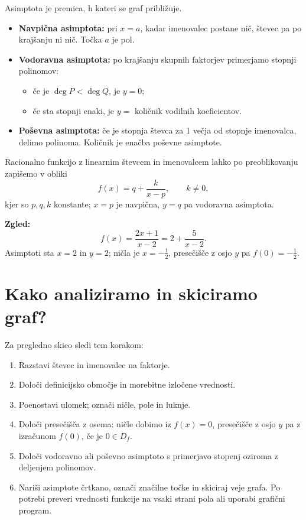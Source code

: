 \documentclass[11pt]{article}
\begin{document}
Asimptota je premica, h kateri se graf približuje.

\begin{itemize}[leftmargin=*]
  \item \textbf{Navpična asimptota:} pri $x=a$, kadar imenovalec postane nič, števec pa po krajšanju ni nič. Točka $a$ je pol.
  \item \textbf{Vodoravna asimptota:} po krajšanju skupnih faktorjev primerjamo stopnji polinomov:
    \begin{itemize}
      \item če je $\deg P<\deg Q$, je $y=0$;
      \item če sta stopnji enaki, je $y=$ količnik vodilnih koeficientov.
    \end{itemize}
  \item \textbf{Poševna asimptota:} če je stopnja števca za 1 večja od stopnje imenovalca, delimo polinoma. Količnik je enačba poševne asimptote.
\end{itemize}

Racionalno funkcijo z linearnim števcem in imenovalcem lahko po preoblikovanju zapišemo v obliki
\[
 f(x)=q+\frac{k}{x-p},\qquad k\ne 0,
\]
kjer so $p,q,k$ konstante; $x=p$ je navpična, $y=q$ pa vodoravna asimptota.

\textbf{Zgled:}
\[
 f(x)=\frac{2x+1}{x-2}=2+\frac{5}{x-2}.
\]
Asimptoti sta $x=2$ in $y=2$; ničla je $x=-\frac{1}{2}$, presečišče z osjo $y$ pa $f(0)=-\frac{1}{2}$.

\section{Kako analiziramo in skiciramo graf?}

Za pregledno skico sledi tem korakom:

\begin{enumerate}[leftmargin=*]
  \item Razstavi števec in imenovalec na faktorje.
  \item Določi definicijsko območje in morebitne izločene vrednosti.
  \item Poenostavi ulomek; označi ničle, pole in luknje.
  \item Določi presečišča z osema: ničle dobimo iz $f(x)=0$, presečišče z osjo $y$ pa z izračunom $f(0)$, če je $0\in D_f$.
  \item Določi vodoravno ali poševno asimptoto s primerjavo stopenj oziroma z deljenjem polinomov.
  \item Nariši asimptote črtkano, označi značilne točke in skiciraj veje grafa. Po potrebi preveri vrednosti funkcije na vsaki strani pola ali uporabi grafični program.
\end{enumerate}
\end{document}
